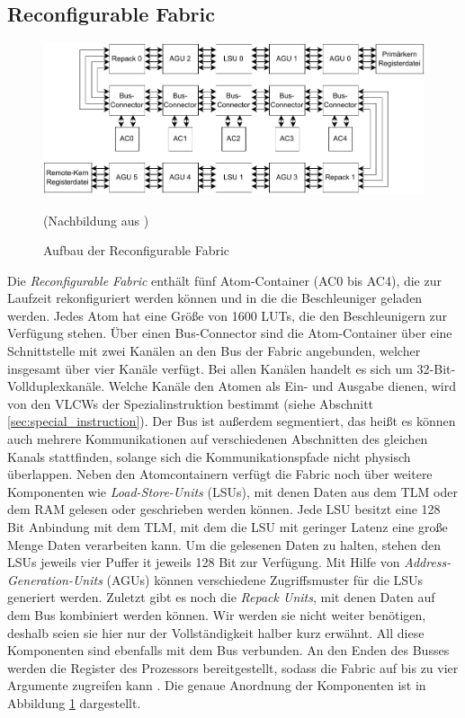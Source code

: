 \subsection{Reconfigurable Fabric}
\begin{figure}
    \center
    \includegraphics{images/Icore_Fabric.pdf}
    \caption{Aufbau der Reconfigurable Fabric}
	(Nachbildung aus \cite{hering2020})
    \label{fig:icore_fabric}
\end{figure}
Die \textit{Reconfigurable Fabric} enthält fünf Atom-Container (AC0 bis AC4), die zur Laufzeit rekonfiguriert werden können und in die die Beschleuniger geladen werden.
Jedes Atom hat eine Größe von 1600 LUTs, die den Beschleunigern zur Verfügung stehen. Über einen Bus-Connector sind die Atom-Container über eine Schnittstelle mit zwei Kanälen
an den Bus der Fabric angebunden, welcher insgesamt über vier Kanäle verfügt. Bei allen Kanälen handelt es sich um 32-Bit-Vollduplexkanäle.
Welche Kanäle den Atomen als Ein- und Ausgabe dienen, wird von den VLCWs der Spezialinstruktion bestimmt (siehe Abschnitt \ref{sec:special_instruction}). 
Der Bus ist außerdem segmentiert, das heißt es können auch mehrere Kommunikationen auf verschiedenen Abschnitten des gleichen Kanals stattfinden,
solange sich die Kommunikationspfade nicht physisch überlappen. Neben den Atomcontainern verfügt die Fabric
noch über weitere Komponenten wie \textit{Load-Store-Units} (LSUs), mit denen Daten aus dem TLM oder dem RAM gelesen oder geschrieben werden können.
Jede LSU besitzt eine 128 Bit Anbindung mit dem TLM, mit dem die LSU mit geringer Latenz eine große Menge Daten verarbeiten kann.
Um die gelesenen Daten zu halten, stehen den LSUs jeweils vier Puffer it jeweils 128 Bit zur Verfügung. Mit Hilfe von \textit{Address-Generation-Units} (AGUs)
können verschiedene Zugriffsmuster für die LSUs generiert werden. Zuletzt gibt es noch die \textit{Repack Units}, mit denen Daten auf dem Bus
kombiniert werden können. Wir werden sie nicht weiter benötigen, deshalb seien sie hier nur der Vollständigkeit halber kurz erwähnt.
All diese Komponenten sind ebenfalls mit dem Bus verbunden. An den Enden des Busses werden die Register des Prozessors bereitgestellt,
sodass die Fabric auf bis zu vier Argumente zugreifen kann \cite{riedlberger2013}. Die genaue Anordnung der Komponenten ist in Abbildung \ref{fig:icore_fabric} dargestellt.

